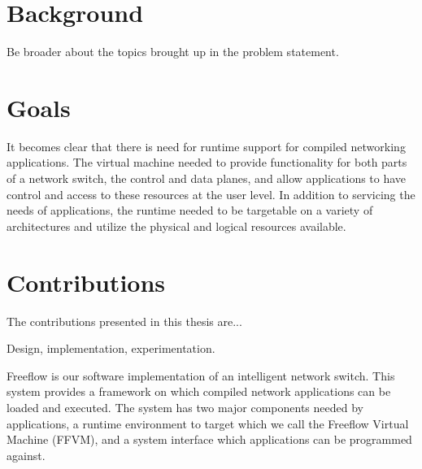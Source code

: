 
\section{Background}
Be broader about the topics brought up in the problem statement.

\section{Goals}
It becomes clear that there is need for runtime support for compiled 
networking applications. The virtual machine needed to provide functionality 
for both parts of a network switch, the control and data planes, and allow 
applications to have control and access to these resources at the user level. 
In addition to servicing the needs of applications, the runtime needed to be 
targetable on a variety of architectures and utilize the physical and logical 
resources available. 

\section{Contributions}
The contributions presented in this thesis are... 

Design, implementation, experimentation.

Freeflow is our software implementation of an intelligent network switch. This
system provides a framework on which compiled network applications can be
loaded and executed. The system has two major components needed by
applications, a runtime environment to target which we call the Freeflow
Virtual Machine (FFVM), and a system interface which applications can be
programmed against.

